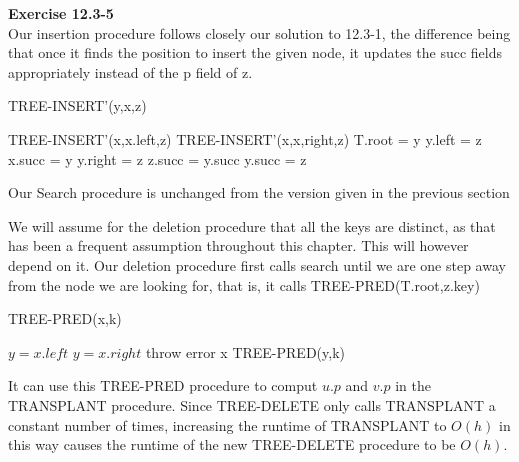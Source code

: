 \documentclass{article}
\begin{document}

\noindent\textbf{ Exercise 12.3-5} \\

Our insertion procedure follows closely our solution to 12.3-1, the difference being that once it finds the position to insert the given node, it updates the succ fields appropriately instead of the p field of z.

\begin{algorithm}
\caption{TREE-INSERT'(y,x,z)}
\begin{algorithmic}
\State TREE-INSERT'(x,x.left,z)
\Else
\State TREE-INSERT'(x,x,right,z)
\EndIf
\EndIf
{}
\State T.root = y
\State y.left = z
\State x.succ = y
\Else
\State y.right = z
\State z.succ = y.succ
\State y.succ = z
\EndIf
\end{algorithmic}
\end{algorithm}

Our Search procedure is unchanged from the version given in the previous section

We will assume for the deletion procedure that all the keys are distinct, as that has been a frequent assumption throughout this chapter. This will however depend on it. Our deletion procedure first calls search until we are one step away from the node we are looking for, that is, it calls TREE-PRED(T.root,z.key)

\begin{algorithm}
\caption{TREE-PRED(x,k)}
\begin{algorithmic}
\State $y = x.left$
\Else
\State $y = x.right$
\EndIf
{}
\State throw error
\State \Return x
\Else
\State \Return TREE-PRED(y,k)
\EndIf
\end{algorithmic}
\end{algorithm}

It can use this TREE-PRED procedure to comput $u.p$ and $v.p$ in the TRANSPLANT procedure. Since TREE-DELETE only calls TRANSPLANT a constant number of times, increasing the runtime of TRANSPLANT to $O(h)$ in this way causes the runtime of the new TREE-DELETE procedure to be $O(h)$.\\
\end{document}
